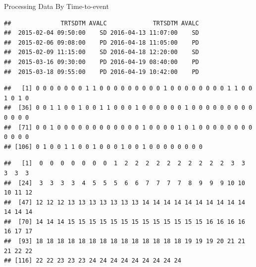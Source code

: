 \begin{frame}[fragile]{Processing Data By Time-to-event}

\tiny

\begin{Shaded}
\begin{Highlighting}[]
\StringTok{ }\NormalTok{response[}\NormalTok{(}\NormalTok{,}\NormalTok{)]}
\NormalTok{(}\NormalTok{(}\NormalTok{), }\NormalTok{)),}\NormalTok{)}
\end{Highlighting}
\end{Shaded}

\begin{verbatim}
##              TRTSDTM AVALC             TRTSDTM AVALC
##  2015-02-04 09:50:00    SD 2016-04-13 11:07:00    SD
##  2015-02-06 09:08:00    PD 2016-04-18 11:05:00    PD
##  2015-02-09 11:15:00    SD 2016-04-18 12:20:00    SD
##  2015-03-16 09:30:00    PD 2016-04-19 08:40:00    PD
##  2015-03-18 09:55:00    PD 2016-04-19 10:42:00    PD
\end{verbatim}

\begin{Shaded}
\begin{Highlighting}[]
\StringTok{ }\NormalTok{r01[}\NormalTok{(response$TRTSDTM)]}
\end{Highlighting}
\end{Shaded}

\begin{verbatim}
##   [1] 0 0 0 0 0 0 0 1 1 0 0 0 0 0 0 0 0 0 1 0 0 0 0 0 0 0 0 1 1 0 0 1 0 1 0
##  [36] 0 0 1 1 0 0 1 0 0 1 1 0 0 0 1 0 0 0 0 0 0 1 0 0 0 0 0 0 0 0 0 0 0 0 0
##  [71] 0 0 1 0 0 0 0 0 0 0 0 0 0 0 0 1 0 0 0 0 1 0 1 0 0 0 0 0 0 0 0 0 0 0 0
## [106] 0 1 0 0 1 1 0 0 1 0 0 0 1 0 0 1 0 0 0 0 0 0 0 0
\end{verbatim}

\begin{Shaded}
\begin{Highlighting}[]
\StringTok{ }\NormalTok{(r01[}\NormalTok{(response$TRTSDTM)])}
\end{Highlighting}
\end{Shaded}

\begin{verbatim}
##   [1]  0  0  0  0  0  0  0  1  2  2  2  2  2  2  2  2  2  2  3  3  3  3  3
##  [24]  3  3  3  3  4  5  5  5  6  6  7  7  7  7  8  9  9  9 10 10 10 11 12
##  [47] 12 12 12 13 13 13 13 13 13 13 14 14 14 14 14 14 14 14 14 14 14 14 14
##  [70] 14 14 14 15 15 15 15 15 15 15 15 15 15 15 15 15 16 16 16 16 16 17 17
##  [93] 18 18 18 18 18 18 18 18 18 18 18 18 18 18 19 19 19 20 21 21 21 22 22
## [116] 22 22 23 23 23 24 24 24 24 24 24 24 24 24
\end{verbatim}

\end{frame}

